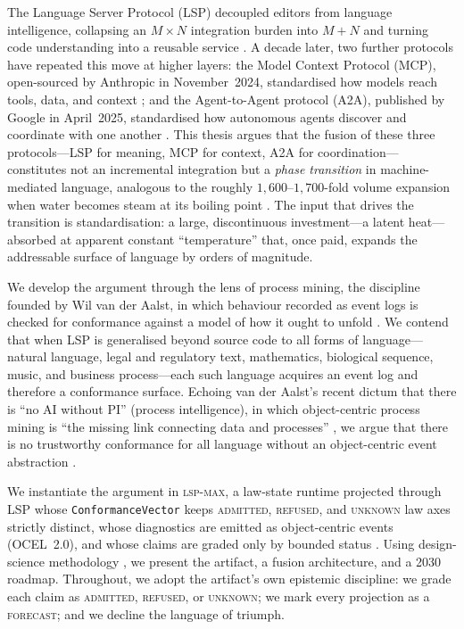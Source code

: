 \documentclass[11pt,a4paper,oneside]{report}
\theoremstyle{plain}
\theoremstyle{definition}
\theoremstyle{remark}
\newcommand{\stat}[1]{\textsc{#1}}
\newcommand{\admitted}{\textcolor{admitted}{\stat{admitted}}}
\def\refused{\textcolor{refused}{\stat{refused}}}
\newcommand{\unknownstat}{\textcolor{unknown}{\stat{unknown}}}
\newcommand{\forecast}{\textcolor{refused}{\stat{forecast}}}
\newcommand{\lspmax}{\mbox{\textsc{lsp-max}}}
\newcommand{\code}[1]{\texttt{#1}}
\begin{document}
The Language Server Protocol (LSP) decoupled editors from language intelligence,
collapsing an $M \times N$ integration burden into $M + N$ and turning code
understanding into a reusable service \citep{lsp-redhat-2016,lsp-official}.
A decade later, two further protocols have repeated this move at higher layers:
the Model Context Protocol (MCP), open-sourced by Anthropic in November~2024,
standardised how models reach tools, data, and context \citep{mcp-anthropic-2024};
and the Agent-to-Agent protocol (A2A), published by Google in April~2025,
standardised how autonomous agents discover and coordinate with one another
\citep{a2a-google-2025}. This thesis argues that the fusion of these three
protocols---LSP for meaning, MCP for context, A2A for coordination---constitutes
not an incremental integration but a \emph{phase transition} in machine-mediated
language, analogous to the roughly $1{,}600$--$1{,}700$-fold volume expansion when
water becomes steam at its boiling point \citep{phys-illinois-steam,nationalboard-steam}.
The input that drives the transition is standardisation: a large, discontinuous
investment---a latent heat---absorbed at apparent constant ``temperature'' that,
once paid, expands the addressable surface of language by orders of magnitude.

We develop the argument through the lens of process mining, the discipline
founded by Wil van der Aalst, in which behaviour recorded as event logs is checked
for conformance against a model of how it ought to unfold
\citep{pm-manifesto-2011,vdaalst-book-2016}. We contend that when LSP is
generalised beyond source code to all forms of language---natural language,
legal and regulatory text, mathematics, biological sequence, music, and business
process---each such language acquires an event log and therefore a conformance
surface. Echoing van der Aalst's recent dictum that there is ``no AI without PI''
(process intelligence), in which object-centric process mining is ``the missing
link connecting data and processes'' \citep{noai-nopi-2025}, we argue that there
is no trustworthy conformance for all language without an object-centric event
abstraction \citep{ocel2-2024}.

We instantiate the argument in \lspmax, a law-state runtime projected through LSP
whose \code{ConformanceVector} keeps \admitted, \refused, and \unknownstat{} law
axes strictly distinct, whose diagnostics are emitted as object-centric events
(OCEL~2.0), and whose claims are graded only by bounded status \citep{lspmax}.
Using design-science methodology \citep{hevner2004,peffers2007}, we present the
artifact, a fusion architecture, and a 2030 roadmap. Throughout, we adopt the
artifact's own epistemic discipline: we grade each claim as \admitted, \refused,
or \unknownstat; we mark every projection as a \forecast; and we decline the
language of triumph.
\end{document}
